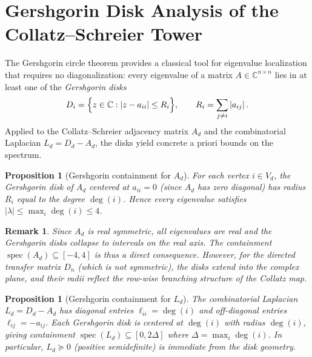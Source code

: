 \documentclass[12pt]{article}
\newtheorem{proposition}[theorem]{Proposition}
\newtheorem{remark}[theorem]{Remark}
\newcommand{\C}{\mathbb{C}}
\newcommand{\spec}{\operatorname{spec}}
\newcommand{\abs}[1]{\left\lvert #1 \right\rvert}
\begin{document}
\section{Gershgorin Disk Analysis of the Collatz--Schreier Tower}
\label{sec:gershgorin}

The Gershgorin circle theorem \cite{gershgorin1931} provides a
classical tool for eigenvalue localization that requires no
diagonalization: every eigenvalue of a matrix $A \in \C^{n \times n}$
lies in at least one of the \emph{Gershgorin disks}
\[
  D_i = \Bigl\{z \in \C : \abs{z - a_{ii}} \le R_i\Bigr\}, \qquad
  R_i = \sum_{j \ne i} \abs{a_{ij}}.
\]
Applied to the Collatz--Schreier adjacency matrix $A_d$ and the
combinatorial Laplacian $L_d = D_d - A_d$, the disks yield concrete a
priori bounds on the spectrum.

\begin{proposition}[Gershgorin containment for $A_d$]
  \label{prop:gersh-adj}
  For each vertex $i \in V_d$, the Gershgorin disk of $A_d$ centered at
  $a_{ii} = 0$ (since $A_d$ has zero diagonal) has radius $R_i$ equal
  to the degree $\deg(i)$.  Hence every eigenvalue satisfies
  $\abs{\lambda} \le \max_i \deg(i) \le 4$.
\end{proposition}

\begin{remark}
  Since $A_d$ is real symmetric, all eigenvalues are real and the
  Gershgorin disks collapse to intervals on the real axis.  The
  containment $\spec(A_d) \subseteq [-4, 4]$ is thus a direct
  consequence.  However, for the \emph{directed} transfer matrix $D_n$
  (which is not symmetric), the disks extend into the complex plane,
  and their radii reflect the row-wise branching structure of the
  Collatz map.
\end{remark}

\begin{proposition}[Gershgorin containment for $L_d$]
  \label{prop:gersh-lap}
  The combinatorial Laplacian $L_d = D_d - A_d$ has diagonal entries
  $\ell_{ii} = \deg(i)$ and off-diagonal entries $\ell_{ij} = -a_{ij}$.
  Each Gershgorin disk is centered at $\deg(i)$ with radius $\deg(i)$,
  giving containment $\spec(L_d) \subseteq [0, 2\Delta]$ where
  $\Delta = \max_i \deg(i)$.  In particular, $L_d \succeq 0$
  (positive semidefinite) is immediate from the disk geometry.
\end{proposition}
\end{document}
